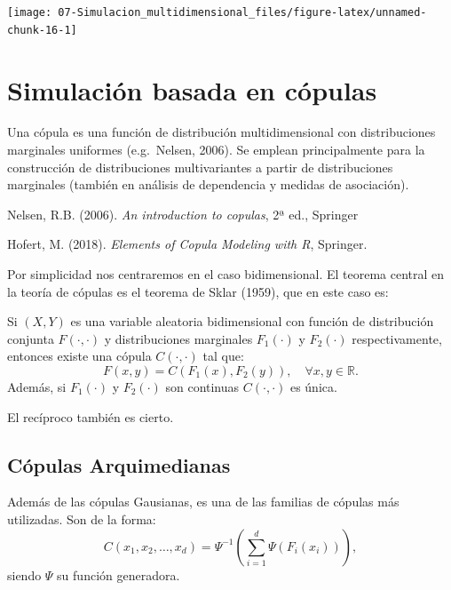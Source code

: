 \documentclass[
]{book}
\theoremstyle{break}
\theoremstyle{definition}
\theoremstyle{definition}
\theoremstyle{definition}
\theoremstyle{remark}
\let\BeginKnitrBlock\begin \let\EndKnitrBlock\end
\begin{document}
\begin{center}\texttt{[image: 07-Simulacion\_multidimensional\_files/figure-latex/unnamed-chunk-16-1]} \end{center}

\hypertarget{simulaciuxf3n-basada-en-cuxf3pulas}{%
\section{Simulación basada en cópulas}\label{simulaciuxf3n-basada-en-cuxf3pulas}}

Una cópula es una función de distribución multidimensional con
distribuciones marginales uniformes (e.g.~Nelsen, 2006).
Se emplean principalmente para la construcción de distribuciones
multivariantes a partir de distribuciones marginales (también en
análisis de dependencia y medidas de asociación).

Nelsen, R.B. (2006). \emph{An introduction to copulas}, 2ª ed., Springer

Hofert, M. (2018). \emph{Elements of Copula Modeling with R}, Springer.

Por simplicidad nos centraremos en el caso bidimensional.
El teorema central en la teoría de cópulas es el teorema de Sklar (1959),
que en este caso es:

\BeginKnitrBlock{theorem}[de Sklar, caso bidimensional]
\protect\hypertarget{thm:sklar}{}{\label{thm:sklar} {} }

Si \((X,Y)\) es una variable aleatoria bidimensional
con función de distribución conjunta \(F(\cdot,\cdot)\) y
distribuciones marginales \(F_1(\cdot)\) y \(F_2(\cdot)\)
respectivamente, entonces existe una cópula \(C(\cdot,\cdot)\) tal
que:
\[F(x,y)=C\left( F_1(x),F_2(y)\right) ,\quad \forall x,y\in\mathbb{R}.\]
Además, si \(F_1(\cdot)\) y \(F_2(\cdot)\) son continuas
\(C(\cdot,\cdot)\) es única.

El recíproco también es cierto.
\EndKnitrBlock{theorem}

\hypertarget{cuxf3pulas-arquimedianas}{%
\subsection{Cópulas Arquimedianas}\label{cuxf3pulas-arquimedianas}}

Además de las cópulas Gausianas, es una de las familias de cópulas más utilizadas.
Son de la forma:
\[C(x_1,x_2,\dots,x_d)
=\Psi^{-1}\left( \sum_{i=1}^d\Psi\left( F_i(x_i)\right)\right),\]
siendo \(\Psi\) su función generadora.
\end{document}
